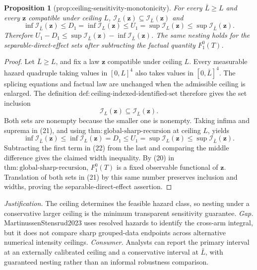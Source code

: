 \documentclass{article}
\newtheorem{proposition}{Proposition}
\begin{document}
\begin{proposition}[prop:ceiling-sensitivity-monotonicity]\label{prop:ceiling-sensitivity-monotonicity}
For every \(\bar L\ge L\) and every \(\mathbf z\) compatible under ceiling \(L\), \(\mathcal I_L(\mathbf z)\subseteq\mathcal I_{\bar L}(\mathbf z)\) and \[\inf\mathcal I_{\bar L}(\mathbf z)\le D_1=\inf\mathcal I_L(\mathbf z)\le U_1=\sup\mathcal I_L(\mathbf z)\le\sup\mathcal I_{\bar L}(\mathbf z).\] Therefore \(U_1-D_1\le\sup\mathcal I_{\bar L}(\mathbf z)-\inf\mathcal I_{\bar L}(\mathbf z)\). The same nesting holds for the separable-direct-effect sets after subtracting the factual quantity \(F_1^0(T)\).
\end{proposition}
\begin{proof}
Let \(\bar L\ge L\), and fix a law \(\mathbf z\) compatible under ceiling \(L\).  Every measurable hazard quadruple taking values in \([0,L]^4\) also takes values in \([0,\bar L]^4\).  The splicing equations and factual law are unchanged when the admissible ceiling is enlarged.  The definition \(\mathrm{def{:}ceiling\text{-}indexed\text{-}identified\text{-}set}\) therefore gives the set inclusion
\[
 \mathcal I_L(\mathbf z)\subseteq\mathcal I_{\bar L}(\mathbf z).  \tag{21}
\]
Both sets are nonempty because the smaller one is nonempty.  Taking infima and suprema in (21), and using \(\mathrm{thm{:}global\text{-}sharp\text{-}recursion}\) at ceiling \(L\), yields
\[
 \inf\mathcal I_{\bar L}(\mathbf z)
 \le \inf\mathcal I_L(\mathbf z)=D_1
 \le U_1=\sup\mathcal I_L(\mathbf z)
 \le \sup\mathcal I_{\bar L}(\mathbf z).                  \tag{22}
\]
Subtracting the first term in (22) from the last and comparing the middle difference gives the claimed width inequality.  By (20) in \(\mathrm{thm{:}global\text{-}sharp\text{-}recursion}\), \(F_1^0(T)\) is a fixed observable functional of \(\mathbf z\).  Translation of both sets in (21) by this same number preserves inclusion and widths, proving the separable-direct-effect assertion.
\end{proof}
\par\smallskip\noindent \textit{Justification.} The ceiling determines the feasible hazard class, so nesting under a conservative larger ceiling is the minimum transparent sensitivity guarantee. \textit{Gap.} MartinussenStensrud2023 uses resolved hazards to identify the cross-arm integral, but it does not compare sharp grouped-data endpoints across alternative numerical intensity ceilings. \textit{Consumer.} Analysts can report the primary interval at an externally calibrated ceiling and a conservative interval at \(\bar L\), with guaranteed nesting rather than an informal robustness comparison.
\end{document}
